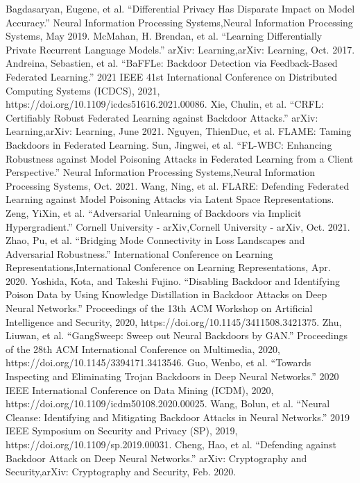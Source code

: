 \documentclass[conference]{IEEEtran}
\begin{document}
\begin{thebibliography}{00}
     Bagdasaryan, Eugene, et al. “Differential Privacy Has Disparate Impact on Model Accuracy.” Neural Information Processing Systems,Neural Information Processing Systems, May 2019.
     McMahan, H. Brendan, et al. “Learning Differentially Private Recurrent Language Models.” arXiv: Learning,arXiv: Learning, Oct. 2017.
     Andreina, Sebastien, et al. “BaFFLe: Backdoor Detection via Feedback-Based Federated Learning.” 2021 IEEE 41st International Conference on Distributed Computing Systems (ICDCS), 2021, https://doi.org/10.1109/icdcs51616.2021.00086.
     Xie, Chulin, et al. “CRFL: Certifiably Robust Federated Learning against Backdoor Attacks.” arXiv: Learning,arXiv: Learning, June 2021.
     Nguyen, ThienDuc, et al. FLAME: Taming Backdoors in Federated Learning.
     Sun, Jingwei, et al. “FL-WBC: Enhancing Robustness against Model Poisoning Attacks in Federated Learning from a Client Perspective.” Neural Information Processing Systems,Neural Information Processing Systems, Oct. 2021.
     Wang, Ning, et al. FLARE: Defending Federated Learning against Model Poisoning Attacks via Latent Space Representations.
     Zeng, YiXin, et al. “Adversarial Unlearning of Backdoors via Implicit Hypergradient.” Cornell University - arXiv,Cornell University - arXiv, Oct. 2021.
     Zhao, Pu, et al. “Bridging Mode Connectivity in Loss Landscapes and Adversarial Robustness.” International Conference on Learning Representations,International Conference on Learning Representations, Apr. 2020.
     Yoshida, Kota, and Takeshi Fujino. “Disabling Backdoor and Identifying Poison Data by Using Knowledge Distillation in Backdoor Attacks on Deep Neural Networks.” Proceedings of the 13th ACM Workshop on Artificial Intelligence and Security, 2020, https://doi.org/10.1145/3411508.3421375.
     Zhu, Liuwan, et al. “GangSweep: Sweep out Neural Backdoors by GAN.” Proceedings of the 28th ACM International Conference on Multimedia, 2020, https://doi.org/10.1145/3394171.3413546.
     Guo, Wenbo, et al. “Towards Inspecting and Eliminating Trojan Backdoors in Deep Neural Networks.” 2020 IEEE International Conference on Data Mining (ICDM), 2020, https://doi.org/10.1109/icdm50108.2020.00025.
     Wang, Bolun, et al. “Neural Cleanse: Identifying and Mitigating Backdoor Attacks in Neural Networks.” 2019 IEEE Symposium on Security and Privacy (SP), 2019, https://doi.org/10.1109/sp.2019.00031.
     Cheng, Hao, et al. “Defending against Backdoor Attack on Deep Neural Networks.” arXiv: Cryptography and Security,arXiv: Cryptography and Security, Feb. 2020.

\end{thebibliography}
\end{document}
